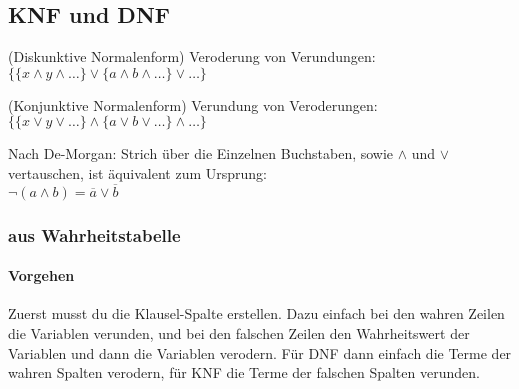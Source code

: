 \documentclass[
    ngerman,
    color=3b,
    summary,
    boxarc,
    main,
    fleqn,
    leqno,
]{rubos-tuda-template}
\begin{document}
    \subsection{KNF und DNF}
    \begin{definition}[DNF]\label{dnf} (Diskunktive Normalenform)
        Veroderung von Verundungen: $\{\{x\land y\land\dots\}\lor\{a\land b\land\dots\}\lor\dots\}$
    \end{definition}
    \begin{definition}[KNF]\label{knf} (Konjunktive Normalenform)
        Verundung von Veroderungen: $\{\{x\lor y\lor\dots\}\land\{a\lor b\lor\dots\}\land\dots\}$
    \end{definition}
    \begin{tipp}
        Nach De-Morgan: Strich über die Einzelnen Buchstaben, sowie $\land$ und $\lor$ vertauschen, ist äquivalent zum Ursprung:\\ 
        $\neg(a\land b) = \overline{a}\lor \overline{b}$
    \end{tipp}
    \subsubsection{aus Wahrheitstabelle}
    \paragraph{Vorgehen} Zuerst musst du die Klausel-Spalte erstellen.
    Dazu einfach bei den wahren Zeilen die Variablen verunden, und bei den falschen Zeilen den Wahrheitswert der Variablen  und dann die Variablen verodern. Für DNF dann einfach die Terme der wahren Spalten verodern, für KNF die Terme der falschen Spalten verunden.
\end{document}
